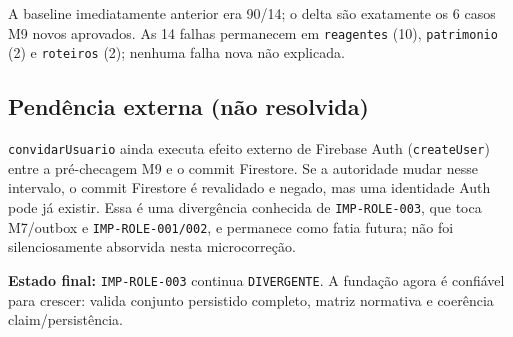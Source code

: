 A baseline imediatamente anterior era 90/14; o delta são exatamente os 6 casos
M9 novos aprovados. As 14 falhas permanecem em \texttt{reagentes} (10),
\texttt{patrimonio} (2) e \texttt{roteiros} (2); nenhuma falha nova não
explicada.

\subsection{Pendência externa (não resolvida)}

\texttt{convidarUsuario} ainda executa efeito externo de Firebase Auth
(\texttt{createUser}) entre a pré-checagem M9 e o commit Firestore. Se a
autoridade mudar nesse intervalo, o commit Firestore é revalidado e negado, mas
uma identidade Auth pode já existir. Essa é uma divergência conhecida de
\texttt{IMP-ROLE-003}, que toca M7/outbox e \texttt{IMP-ROLE-001/002}, e
permanece como fatia futura; não foi silenciosamente absorvida nesta
microcorreção.

\textbf{Estado final:} \texttt{IMP-ROLE-003} continua \texttt{DIVERGENTE}. A
fundação agora é confiável para crescer: valida conjunto persistido completo,
matriz normativa e coerência claim/persistência.

